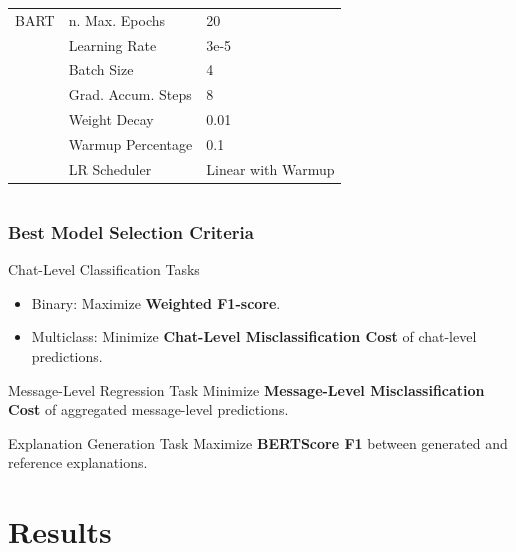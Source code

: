 \documentclass[aspectratio=169]{beamer}
\begin{document}
\begin{frame}
\begin{columns}[T]
\begin{column}{0.45\textwidth}
\begin{table}
{\begin{tabular}{lll}
            \hline
              BART & n. Max. Epochs & 20 \\
              & Learning Rate & 3e-5 \\
              & Batch Size & 4 \\
              & Grad. Accum. Steps & 8 \\
              & Weight Decay & 0.01 \\
              & Warmup Percentage & 0.1 \\
              & LR Scheduler & Linear with Warmup \\
            \hline
          \end{tabular}%
        }
      \end{table}
    \end{column}
  \end{columns}
\end{frame}

  

\begin{frame}
  \frametitle{Best Model Selection Criteria}
  \begin{block}{Chat-Level Classification Tasks}
    \begin{itemize}
      \item Binary: Maximize \textbf{Weighted F1-score}.
      \item Multiclass: Minimize \textbf{Chat-Level Misclassification Cost} of chat-level predictions.
    \end{itemize}
  \end{block}
  \begin{block}{Message-Level Regression Task}
    Minimize \textbf{Message-Level Misclassification Cost} of aggregated message-level predictions.
  \end{block}
  \begin{block}{Explanation Generation Task}
    Maximize \textbf{BERTScore F1} between generated and reference explanations.
  \end{block}
\end{frame}

\section{Results}
\end{document}
